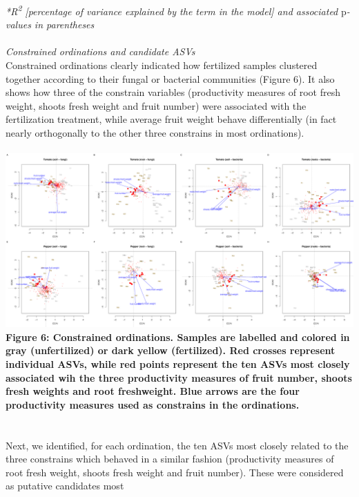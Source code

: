 \documentclass[11pt,]{article}
\begin{document}
\emph{*R\textsuperscript{2} {[}percentage of variance explained by the
term in the model{]} and associated }p\emph{-values in parentheses} ~\\
\hspace*{0.333em}\\
\emph{Constrained ordinations and candidate ASVs}\\
Constrained ordinations clearly indicated how fertilized samples
clustered together according to their fungal or bacterial communities
(Figure 6). It also shows how three of the constrain variables
(productivity measures of root fresh weight, shoots fresh weight and
fruit number) were associated with the fertilization treatment, while
average fruit weight behave differentially (in fact nearly orthogonally
to the other three constrains in most ordinations).\\
\hspace*{0.333em}\\
\includegraphics{../figures/Figure6_rda.pdf}\\
\textbf{Figure 6: Constrained ordinations. Samples are labelled and
colored in gray (unfertilized) or dark yellow (fertilized). Red crosses
represent individual ASVs, while red points represent the ten ASVs most
closely associated wih the three productivity measures of fruit number,
shoots fresh weights and root freshweight. Blue arrows are the four
productivity measures used as constrains in the ordinations.}\\
\hspace*{0.333em}\\
\hspace*{0.333em}\\
Next, we identified, for each ordination, the ten ASVs most closely
related to the three constrains which behaved in a similar fashion
(productivity measures of root fresh weight, shoots fresh weight and
fruit number). These were considered as putative candidates most
\end{document}
